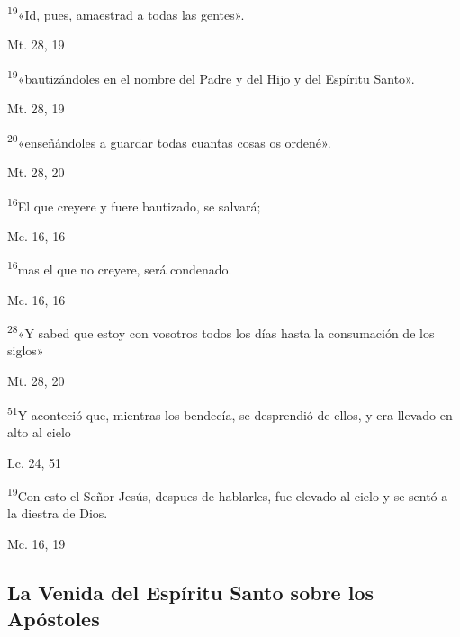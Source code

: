 \documentclass[a4paper,11pt]{article}
\begin{document}
      \textsuperscript{19}«Id, pues, amaestrad a todas las gentes».
      \begin{flushright}
        Mt. 28, 19
      \end{flushright}

      \textsuperscript{19}«bautizándoles en el nombre del Padre y del Hijo y del Espíritu Santo».
      \begin{flushright}
        Mt. 28, 19      
      \end{flushright}

      \textsuperscript{20}«enseñándoles a guardar todas cuantas cosas os ordené».
      \begin{flushright}
        Mt. 28, 20  
      \end{flushright}

      \textsuperscript{16}El que creyere y fuere bautizado, se salvará;
      \begin{flushright}
        Mc. 16, 16
      \end{flushright}

      \textsuperscript{16}mas el que no creyere, será condenado.
      \begin{flushright}
        Mc. 16, 16
      \end{flushright}

      \textsuperscript{28}«Y sabed que estoy con vosotros todos los días hasta la consumación de los siglos»
      \begin{flushright}
        Mt. 28, 20
      \end{flushright}

      \textsuperscript{51}Y aconteció que, mientras los bendecía, se desprendió de ellos, y era llevado en alto al cielo
      \begin{flushright}
        Lc. 24, 51
      \end{flushright}

      \textsuperscript{19}Con esto el Señor Jesús, despues de hablarles, fue elevado al cielo y se sentó a la diestra de Dios.
      \begin{flushright}
        Mc. 16, 19
      \end{flushright}
    \subsection*{\hfil La Venida del Espíritu Santo sobre los Apóstoles \hfil}
\end{document}
